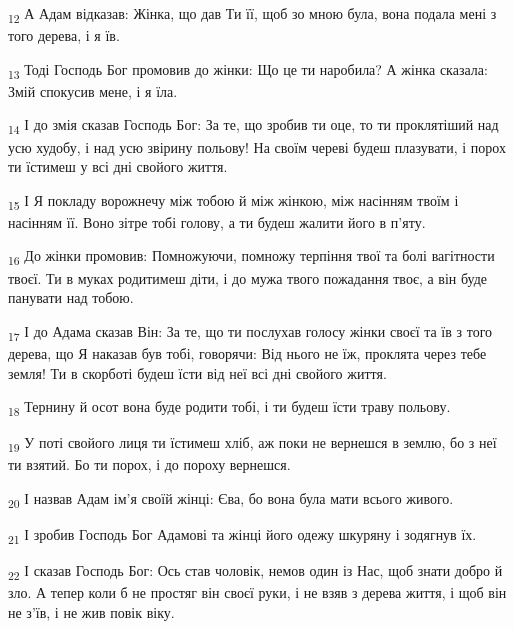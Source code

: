 \begin{tcolorbox}
\textsubscript{12} А Адам відказав: Жінка, що дав Ти її, щоб зо мною була, вона подала мені з того дерева, і я їв.
\end{tcolorbox}
\begin{tcolorbox}
\textsubscript{13} Тоді Господь Бог промовив до жінки: Що це ти наробила? А жінка сказала: Змій спокусив мене, і я їла.
\end{tcolorbox}
\begin{tcolorbox}
\textsubscript{14} І до змія сказав Господь Бог: За те, що зробив ти оце, то ти проклятіший над усю худобу, і над усю звірину польову! На своїм череві будеш плазувати, і порох ти їстимеш у всі дні свойого життя.
\end{tcolorbox}
\begin{tcolorbox}
\textsubscript{15} І Я покладу ворожнечу між тобою й між жінкою, між насінням твоїм і насінням її. Воно зітре тобі голову, а ти будеш жалити його в п'яту.
\end{tcolorbox}
\begin{tcolorbox}
\textsubscript{16} До жінки промовив: Помножуючи, помножу терпіння твої та болі вагітности твоєї. Ти в муках родитимеш діти, і до мужа твого пожадання твоє, а він буде панувати над тобою.
\end{tcolorbox}
\begin{tcolorbox}
\textsubscript{17} І до Адама сказав Він: За те, що ти послухав голосу жінки своєї та їв з того дерева, що Я наказав був тобі, говорячи: Від нього не їж, проклята через тебе земля! Ти в скорботі будеш їсти від неї всі дні свойого життя.
\end{tcolorbox}
\begin{tcolorbox}
\textsubscript{18} Тернину й осот вона буде родити тобі, і ти будеш їсти траву польову.
\end{tcolorbox}
\begin{tcolorbox}
\textsubscript{19} У поті свойого лиця ти їстимеш хліб, аж поки не вернешся в землю, бо з неї ти взятий. Бо ти порох, і до пороху вернешся.
\end{tcolorbox}
\begin{tcolorbox}
\textsubscript{20} І назвав Адам ім'я своїй жінці: Єва, бо вона була мати всього живого.
\end{tcolorbox}
\begin{tcolorbox}
\textsubscript{21} І зробив Господь Бог Адамові та жінці його одежу шкуряну і зодягнув їх.
\end{tcolorbox}
\begin{tcolorbox}
\textsubscript{22} І сказав Господь Бог: Ось став чоловік, немов один із Нас, щоб знати добро й зло. А тепер коли б не простяг він своєї руки, і не взяв з дерева життя, і щоб він не з'їв, і не жив повік віку.
\end{tcolorbox}

